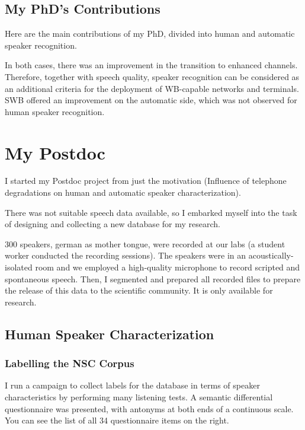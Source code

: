 \documentclass[a4paper]{article}
\begin{document}
\subsection{My PhD's Contributions}

Here are the main contributions of my PhD, divided into human and automatic speaker recognition. 

In both cases, there was an improvement in the transition to enhanced channels. Therefore, together with speech quality, speaker recognition can be considered as an additional criteria for the deployment of WB-capable networks and terminals. SWB offered an improvement on the automatic side, which was not observed for human speaker recognition.



\section{My Postdoc}

I started my Postdoc project from just the motivation (Influence of telephone degradations on human and automatic speaker characterization). 

There was not suitable speech data available, so I embarked myself into the task of designing and collecting a new database for my research.

300 speakers, german as mother tongue, were recorded at our labs (a student worker conducted the recording sessions). The speakers were in an acoustically-isolated room and we employed a high-quality microphone to record scripted and spontaneous speech. Then, I segmented and prepared all recorded files to prepare the release of this data to the scientific community. It is only available for research.


\subsection{Human Speaker Characterization}

\subsubsection{Labelling the NSC Corpus}

I run a campaign to collect labels for the database in terms of speaker characteristics by performing many listening tests. A semantic differential questionnaire was presented, with antonyms at both ends of a continuous scale. You can see the list of all 34 questionnaire items on the right.
\end{document}
